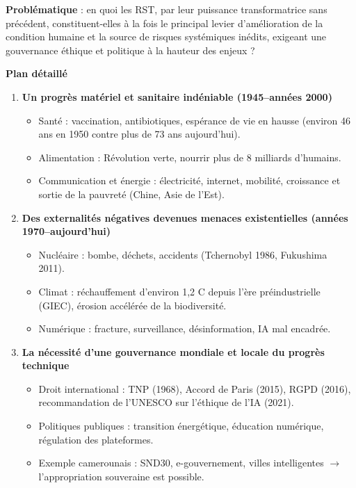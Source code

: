 \documentclass[11pt]{article}
\begin{document}
\begin{exoresolu}
\textbf{Problématique} : en quoi les RST, par leur puissance transformatrice sans précédent, constituent-elles à la fois le principal levier d'amélioration de la condition humaine et la source de risques systémiques inédits, exigeant une gouvernance éthique et politique à la hauteur des enjeux ?

\textbf{Plan détaillé}
\begin{enumerate}
    \item \textbf{Un progrès matériel et sanitaire indéniable (1945--années 2000)}
    \begin{itemize}
        \item Santé : vaccination, antibiotiques, espérance de vie en hausse (environ 46 ans en 1950 contre plus de 73 ans aujourd'hui).
        \item Alimentation : Révolution verte, nourrir plus de 8 milliards d'humains.
        \item Communication et énergie : électricité, internet, mobilité, croissance et sortie de la pauvreté (Chine, Asie de l'Est).
    \end{itemize}
    \item \textbf{Des externalités négatives devenues menaces existentielles (années 1970--aujourd'hui)}
    \begin{itemize}
        \item Nucléaire : bombe, déchets, accidents (Tchernobyl 1986, Fukushima 2011).
        \item Climat : réchauffement d'environ 1,2 \textdegree C depuis l'ère préindustrielle (GIEC), érosion accélérée de la biodiversité.
        \item Numérique : fracture, surveillance, désinformation, IA mal encadrée.
    \end{itemize}
    \item \textbf{La nécessité d'une gouvernance mondiale et locale du progrès technique}
    \begin{itemize}
        \item Droit international : TNP (1968), Accord de Paris (2015), RGPD (2016), recommandation de l'UNESCO sur l'éthique de l'IA (2021).
        \item Politiques publiques : transition énergétique, éducation numérique, régulation des plateformes.
        \item Exemple camerounais : SND30, e-gouvernement, villes intelligentes $\rightarrow$ l'appropriation souveraine est possible.
    \end{itemize}
\end{enumerate}


\end{exoresolu}
\end{document}
